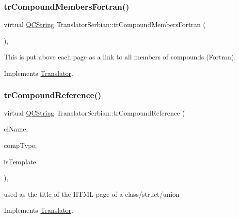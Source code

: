 \subsubsection{\texorpdfstring{trCompoundMembersFortran()}{trCompoundMembersFortran()}}
{\footnotesize\ttfamily virtual \mbox{\hyperlink{class_q_c_string}{Q\+C\+String}} Translator\+Serbian\+::tr\+Compound\+Members\+Fortran (\begin{DoxyParamCaption}{ }\end{DoxyParamCaption})\hspace{0.3cm}{\ttfamily [inline]}, {\ttfamily [virtual]}}

This is put above each page as a link to all members of compounds (Fortran). 

Implements \mbox{\hyperlink{class_translator}{Translator}}.

\mbox{\label{class_translator_serbian_ac250c3310d4f9037a83a98b5c256a60a}} 
\subsubsection{\texorpdfstring{trCompoundReference()}{trCompoundReference()}}
{\footnotesize\ttfamily virtual \mbox{\hyperlink{class_q_c_string}{Q\+C\+String}} Translator\+Serbian\+::tr\+Compound\+Reference (\begin{DoxyParamCaption}\item[{const char $\ast$}]{cl\+Name,  }\item[{\mbox{\hyperlink{class_class_def_ae70cf86d35fe954a94c566fbcfc87939}{Class\+Def\+::\+Compound\+Type}}}]{comp\+Type,  }\item[{bool}]{is\+Template }\end{DoxyParamCaption})\hspace{0.3cm}{\ttfamily [inline]}, {\ttfamily [virtual]}}

used as the title of the H\+T\+ML page of a class/struct/union 

Implements \mbox{\hyperlink{class_translator}{Translator}}.

\mbox{\label{class_translator_serbian_ae14c3b9ba39843487e001d8026bfd616}} 
